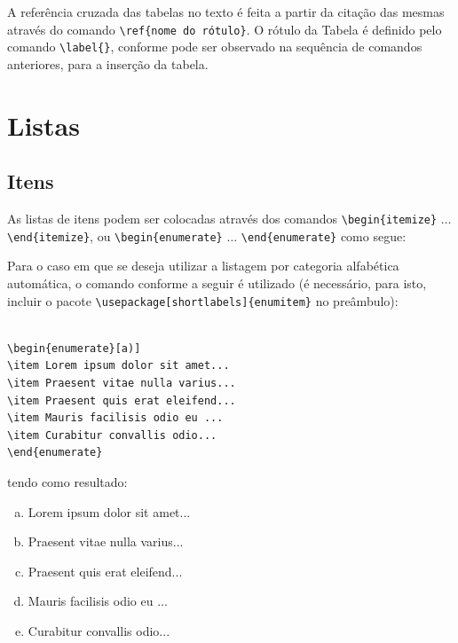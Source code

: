 \documentclass[12pt,A4,A4pt]{article}
\begin{document}
{A referência cruzada das tabelas no texto é feita a partir da citação das mesmas através do comando \verb|\ref{nome do rótulo}|. O rótulo da Tabela é definido pelo comando \verb|\label{}|, conforme pode ser observado na sequência de comandos anteriores, para a inserção da tabela.

\section{Listas}

\subsection{Itens}

As listas de itens podem ser colocadas através dos comandos \break \verb|\begin{itemize}| $ \ldots $ \verb|\end{itemize}|, ou \verb|\begin{enumerate}| $ \ldots $ \verb|\end{enumerate}|  como segue:



Para o caso em que se deseja utilizar a listagem por categoria alfabética automática, o comando conforme a seguir é utilizado (é necessário, para isto, incluir o pacote \break \verb|\usepackage[shortlabels]{enumitem}| no preâmbulo):

\begin{verbatim}
    
\begin{enumerate}[a)] 
\item Lorem ipsum dolor sit amet...
\item Praesent vitae nulla varius...
\item Praesent quis erat eleifend...
\item Mauris facilisis odio eu ...
\item Curabitur convallis odio...
\end{enumerate}

\end{verbatim}

tendo como resultado:

\begin{enumerate}[a)] 
\item Lorem ipsum dolor sit amet...
\item Praesent vitae nulla varius...
\item Praesent quis erat eleifend...
\item Mauris facilisis odio eu ...
\item Curabitur convallis odio...
\end{enumerate}

}
\end{document}
